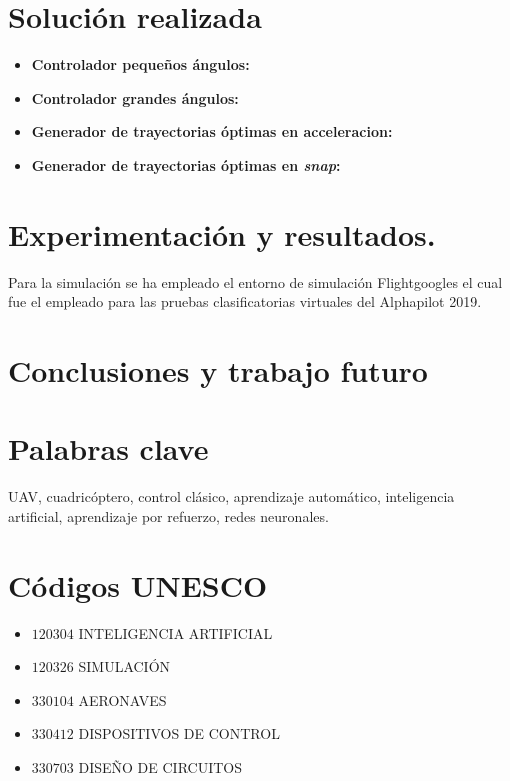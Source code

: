 \section*{Solución realizada}

\begin{itemize}
	\item \textbf{Controlador pequeños ángulos:}
	\item \textbf{Controlador grandes ángulos:}
	\item \textbf{Generador de trayectorias óptimas en acceleracion:}
	\item \textbf{Generador de trayectorias óptimas en \textit{snap}:}
\end{itemize}

\section*{Experimentación y resultados.}

Para la simulación se ha empleado el entorno de simulación Flightgoogles   el cual fue el empleado para las pruebas clasificatorias virtuales del Alphapilot 2019.



\section*{Conclusiones y trabajo futuro}

\section*{Palabras clave}
UAV, cuadricóptero, control clásico, aprendizaje automático, inteligencia artificial, aprendizaje por refuerzo, redes neuronales.

\section*{Códigos UNESCO}
\begin{itemize}
	\item[] $120304$ \quad INTELIGENCIA ARTIFICIAL
	\item[] $120326$ \quad SIMULACIÓN
	\item[] $330104$ \quad AERONAVES
	\item[] $330412$ \quad DISPOSITIVOS DE CONTROL
	\item[] $330703$ \quad DISEÑO DE CIRCUITOS 

\end{itemize}
\newpage
\cleardoublepage